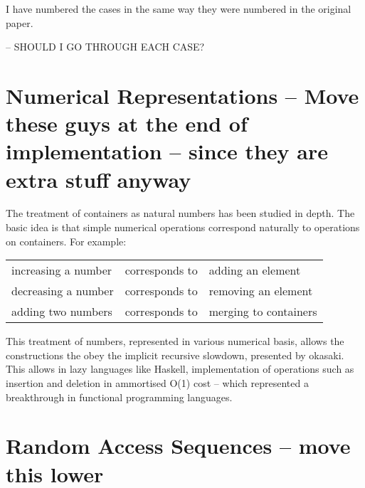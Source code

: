 \documentclass[12pt,twoside,notitlepage]{report}
\begin{document}
I have numbered the cases in the same way they were numbered in the original paper. 

-- SHOULD I GO THROUGH EACH CASE?



































\section{Numerical Representations -- Move these guys at the end of implementation -- since they are extra stuff anyway}
The treatment of containers as natural numbers has been studied in depth\cite{okasaki}. The basic idea is that simple numerical operations correspond naturally to operations on containers. For example:

\vspace{5mm} %
\begin{tabular}{lcl}
increasing a number & corresponds to & adding an element\\
decreasing a number & corresponds to & removing an element \\
adding two numbers & corresponds to & merging to containers \\
\end{tabular} 
\clearpage 

This treatment of numbers, represented in various numerical basis, allows the constructions the obey the implicit recursive slowdown, presented by okasaki. This allows in lazy languages like Haskell, implementation of operations such as insertion and deletion in ammortised O(1) cost -- which represented a breakthrough in functional programming languages.

\section{Random Access Sequences -- move this lower}
\end{document}
